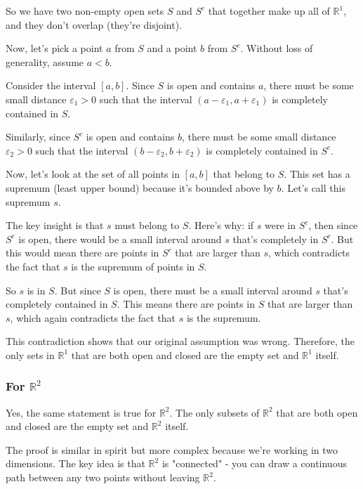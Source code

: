 So we have two non-empty open sets $S$ and $S^c$ that together make up all of $\mathbb{R}^1$, and they don't overlap (they're disjoint).

Now, let's pick a point $a$ from $S$ and a point $b$ from $S^c$. Without loss of generality, assume $a < b$.

Consider the interval $[a, b]$. Since $S$ is open and contains $a$, there must be some small distance $\varepsilon_1 > 0$ such that the interval $(a - \varepsilon_1, a + \varepsilon_1)$ is completely contained in $S$.

Similarly, since $S^c$ is open and contains $b$, there must be some small distance $\varepsilon_2 > 0$ such that the interval $(b - \varepsilon_2, b + \varepsilon_2)$ is completely contained in $S^c$.

Now, let's look at the set of all points in $[a, b]$ that belong to $S$. This set has a supremum (least upper bound) because it's bounded above by $b$. Let's call this supremum $s$.

The key insight is that $s$ must belong to $S$. Here's why: if $s$ were in $S^c$, then since $S^c$ is open, there would be a small interval around $s$ that's completely in $S^c$. But this would mean there are points in $S^c$ that are larger than $s$, which contradicts the fact that $s$ is the supremum of points in $S$.

So $s$ is in $S$. But since $S$ is open, there must be a small interval around $s$ that's completely contained in $S$. This means there are points in $S$ that are larger than $s$, which again contradicts the fact that $s$ is the supremum.

This contradiction shows that our original assumption was wrong. Therefore, the only sets in $\mathbb{R}^1$ that are both open and closed are the empty set and $\mathbb{R}^1$ itself.

\subsubsection*{For $\mathbb{R}^2$}

Yes, the same statement is true for $\mathbb{R}^2$. The only subsets of $\mathbb{R}^2$ that are both open and closed are the empty set and $\mathbb{R}^2$ itself.

The proof is similar in spirit but more complex because we're working in two dimensions. The key idea is that $\mathbb{R}^2$ is "connected" - you can draw a continuous path between any two points without leaving $\mathbb{R}^2$.

